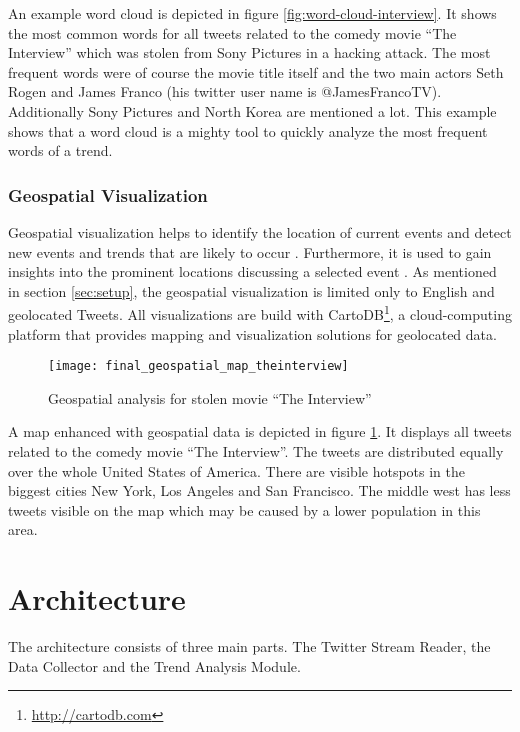An example word cloud is depicted in figure \ref{fig:word-cloud-interview}. It shows the most common words for all tweets related to the comedy movie \enquote{The Interview} which was stolen from Sony Pictures in a hacking attack. The most frequent words were of course the movie title itself and the two main actors Seth Rogen and James Franco (his twitter user name is @JamesFrancoTV). Additionally Sony Pictures and North Korea are mentioned a lot. This example shows that a word cloud is a mighty tool to quickly analyze the most frequent words of a trend.


\subsubsection{Geospatial Visualization}
\label{subsubsection:vis-geospatial}
Geospatial visualization helps to identify the location of current events and detect new events and trends that are likely to occur \cite{TwitterDataAnalytics2013}. Furthermore, it is used to gain insights into the prominent locations discussing a selected event \cite[64-66]{TwitterDataAnalytics2013}. As mentioned in section \ref{sec:setup}, the geospatial visualization is limited only to English and geolocated Tweets. All visualizations are build with CartoDB\footnote{\url{http://cartodb.com} \accessednote}, a cloud-computing platform that provides mapping and visualization solutions for geolocated data. 

\begin{figure}[H]
  \centering
        \texttt{[image: final\_geospatial\_map\_theinterview]}
  \caption[Geospatial analysis for stolen movie \enquote{The Interview}]{Geospatial analysis for stolen movie \enquote{The Interview}}
  \label{fig:map-interview}
  \vspace{-1.3em}
\end{figure}

A map enhanced with geospatial data is depicted in figure \ref{fig:map-interview}. It displays all tweets related to the comedy movie \enquote{The Interview}. The tweets are distributed equally over the whole United States of America. There are visible hotspots in the biggest cities New York, Los Angeles and San Francisco. The middle west has less tweets visible on the map which may be caused by a lower population in this area.

\section{Architecture}
\label{sec:architecture}
The architecture consists of three main parts. The Twitter Stream Reader, the Data Collector and the Trend Analysis Module.

